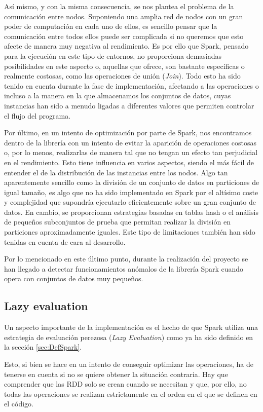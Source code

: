 Así mismo, y con la misma consecuencia, se nos plantea el problema de la comunicación entre nodos. Suponiendo una amplia red de nodos con un gran poder de computación en cada uno de ellos, es sencillo pensar que la comunicación entre todos ellos puede ser complicada si no queremos que esto afecte de manera muy negativa al rendimiento. Es por ello que Spark, pensado para la ejecución en este tipo de entornos, no proporciona demasiadas posibilidades en este aspecto o, aquellas que ofrece, son bastante específicas o realmente costosas, como las operaciones de unión (\textit{Join}). Todo esto ha sido tenido en cuenta durante la fase de implementación, afectando a las operaciones o incluso a la manera en la que almacenamos los conjuntos de datos, cuyas instancias han sido a menudo ligadas a diferentes valores que permiten controlar el flujo del programa.

Por último, en un intento de optimización por parte de Spark, nos encontramos dentro de la librería con un intento de evitar la aparición de operaciones costosas o, por lo menos, realizarlas de manera tal que no tengan un efecto tan perjudicial en el rendimiento. Esto tiene influencia en varios aspectos, siendo el más fácil de entender el de la distribución de las instancias entre los nodos. Algo tan aparentemente sencillo como la división de un conjunto de datos en particiones de igual tamaño, es algo que no ha sido implementado en Spark por el altísimo coste y complejidad que supondría ejecutarlo eficientemente sobre un gran conjunto de datos. En cambio, se proporcionan estrategias basadas en tablas hash o el análisis de pequeños subconjuntos de prueba que permitan realizar la división en particiones aproximadamente iguales. Este tipo de limitaciones también han sido tenidas en cuenta de cara al desarrollo.

Por lo mencionado en este último punto, durante la realización del proyecto se han llegado a detectar funcionamientos anómalos de la librería Spark cuando opera con conjuntos de datos muy pequeños. 

\subsection{Lazy evaluation}

Un aspecto importante de la implementación es el hecho de que Spark utiliza una estrategia de evaluación perezosa (\textit{Lazy Evaluation}) como ya ha sido definido en la sección \ref{sec:DefSpark}.

Esto, si bien se hace en un intento de conseguir optimizar las operaciones, ha de tenerse en cuenta si no se quiere obtener la situación contraria. Hay que comprender que las RDD solo se crean cuando se necesitan y que, por ello, no todas las operaciones se realizan estrictamente en el orden en el que se definen en el código.

